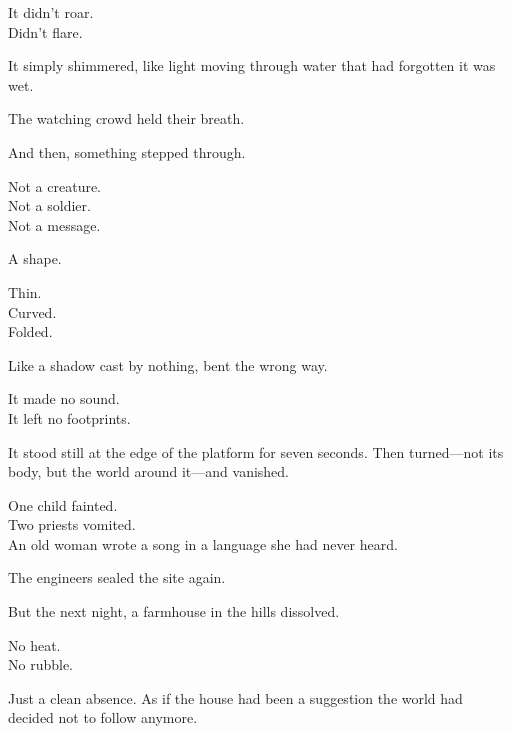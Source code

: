 \documentclass[9pt]{article}
\begin{document}
\vspace{0.5em}
It didn’t roar.\\
Didn’t flare.

\vspace{0.5em}
It simply shimmered, like light moving through water that had forgotten it was wet.

\vspace{0.5em}
The watching crowd held their breath.

\vspace{0.5em}
And then, something stepped through.

\vspace{0.5em}
Not a creature.\\
Not a soldier.\\
Not a message.

\vspace{0.5em}
A shape.

\vspace{0.5em}
Thin.\\
Curved.\\
Folded.

\vspace{0.5em}
Like a shadow cast by nothing, bent the wrong way.

\vspace{0.5em}
It made no sound.\\
It left no footprints.

\vspace{0.5em}
It stood still at the edge of the platform for seven seconds. Then turned---not its body, but the world around it---and vanished.

\vspace{0.5em}
One child fainted.\\
Two priests vomited.\\
An old woman wrote a song in a language she had never heard.

\vspace{0.5em}
The engineers sealed the site again.

\vspace{0.5em}
But the next night, a farmhouse in the hills dissolved.

\vspace{0.5em}
No heat.\\
No rubble.

\vspace{0.5em}
Just a clean absence. As if the house had been a suggestion the world had decided not to follow anymore.
\end{document}
